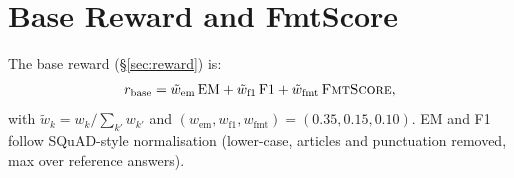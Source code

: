 \documentclass[11pt]{article}
\begin{document}




\section{Base Reward and FmtScore}
\label{app:reward}

The base reward (\S\ref{sec:reward}) is:
\begin{equation}
r_{\text{base}} = \tilde{w}_{\text{em}}\,\text{EM} + \tilde{w}_{\text{f1}}\,\text{F1} + \tilde{w}_{\text{fmt}}\,\textsc{FmtScore},
\label{eq:rbase}
\end{equation}
with $\tilde{w}_k = w_k / \sum_{k'}w_{k'}$ and 
$(w_{\text{em}}, w_{\text{f1}}, w_{\text{fmt}})=(0.35, 0.15, 0.10)$.
\textsc{EM} and \textsc{F1} follow SQuAD-style 
normalisation (lower-case, articles and punctuation 
removed, max over reference answers).
\end{document}
